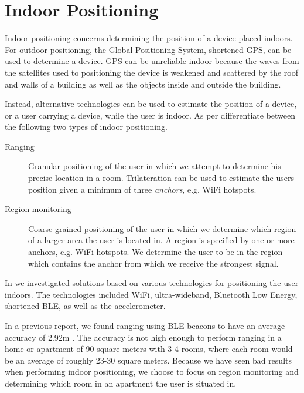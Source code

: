 \section{Indoor Positioning}
\label{sec:analysis:indoor-positioning}

Indoor positioning concerns determining the position of a device placed indoors. For outdoor positioning, the Global Positioning System, shortened GPS, can be used to determine a device. GPS can be unreliable indoor because the waves from the satellites used to positioning the device is weakened and scattered by the roof and walls of a building as well as the objects inside and outside the building.

Instead, alternative technologies can be used to estimate the position of a device, or a user carrying a device, while the user is indoor. As per \cite{prespecialisation} differentiate between the following two types of indoor positioning.

\begin{description}
\item[Ranging] Granular positioning of the user in which we attempt to determine his precise location in a room. Trilateration can be used to estimate the users position given a minimum of three \emph{anchors}, e.g. WiFi hotspots.
\item[Region monitoring] Coarse grained positioning of the user in which we determine which region of a larger area the user is located in. A region is specified by one or more anchors, e.g. WiFi hotspots. We determine the user to be in the region which contains the anchor from which we receive the strongest signal.
\end{description}

In \cite{prespecialisation} we investigated solutions based on various technologies for positioning the user indoors. The technologies included WiFi, ultra-wideband, Bluetooth Low Energy, shortened BLE, as well as the accelerometer.

In a previous report, we found ranging using BLE beacons to have an average accuracy of 2.92m \cite[p. 63]{prespecialisation}. The accuracy is not high enough to perform ranging in a home or apartment of 90 square meters with 3-4 rooms, where each room would be an average of roughly 23-30 square meters. Because we have seen bad results when performing indoor positioning, we choose to focus on region monitoring and determining which room in an apartment the user is situated in.



